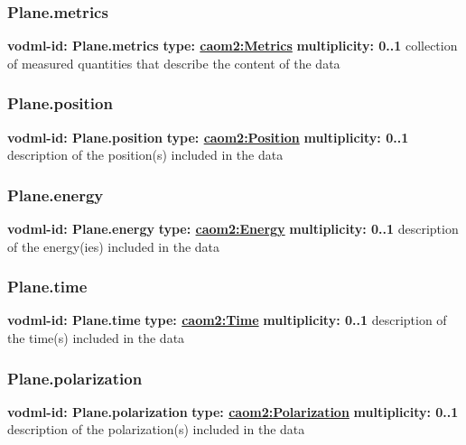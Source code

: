     \subsubsection{Plane.metrics}
      \textbf{vodml-id: Plane.metrics} \newline
      \textbf{type: \hyperref[sect:Metrics]{caom2:Metrics}} \newline
      \textbf{multiplicity: 0..1} \newline
      collection of measured quantities that describe the content of the data

    \subsubsection{Plane.position}
      \textbf{vodml-id: Plane.position} \newline
      \textbf{type: \hyperref[sect:Position]{caom2:Position}} \newline
      \textbf{multiplicity: 0..1} \newline
      description of the position(s) included in the data

    \subsubsection{Plane.energy}
      \textbf{vodml-id: Plane.energy} \newline
      \textbf{type: \hyperref[sect:Energy]{caom2:Energy}} \newline
      \textbf{multiplicity: 0..1} \newline
      description of the energy(ies) included in the data

    \subsubsection{Plane.time}
      \textbf{vodml-id: Plane.time} \newline
      \textbf{type: \hyperref[sect:Time]{caom2:Time}} \newline
      \textbf{multiplicity: 0..1} \newline
      description of the time(s) included in the data

    \subsubsection{Plane.polarization}
      \textbf{vodml-id: Plane.polarization} \newline
      \textbf{type: \hyperref[sect:Polarization]{caom2:Polarization}} \newline
      \textbf{multiplicity: 0..1} \newline
      description of the polarization(s) included in the data


